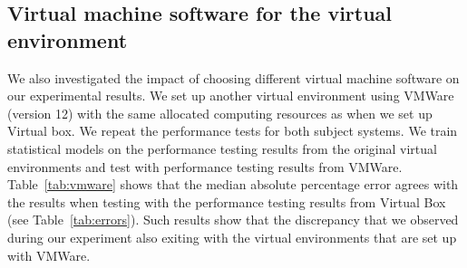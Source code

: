 






\subsection{Virtual machine software for the virtual environment}

We also investigated the impact of choosing different virtual machine software on our experimental results. We set up another virtual environment using VMWare (version 12) with the same allocated computing resources as when we set up Virtual box. We repeat the performance tests for both subject systems. We train statistical models on the performance testing results from the original virtual environments and test with performance testing results from VMWare. Table~\ref{tab:vmware} shows that the median absolute percentage error agrees with the results when testing with the performance testing results from Virtual Box (see Table~\ref{tab:errors}). Such results show that the discrepancy that we observed during our experiment also exiting with the virtual environments that are set up with VMWare.


